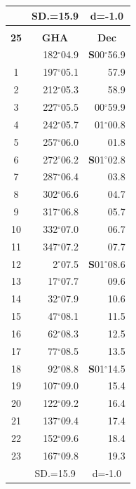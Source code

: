 \documentclass[10pt, a4paper]{report}
\begin{document}
\begin{scriptsize}
\begin{tabular*}{0.2\textwidth}[t]{@{\extracolsep{\fill}}|c|rr|}
\hline
\rule{0pt}{2.4ex} & \multicolumn{1}{c}{SD.=15.9} & \multicolumn{1}{c|}{d=-1.0}\\
\hline
\multicolumn{1}{c}{}\\[-0.5ex]\hline
\multicolumn{1}{|c|}{\rule{0pt}{2.6ex}\textbf{25}} & \multicolumn{1}{c}{\textbf{GHA}} & \multicolumn{1}{c|}{\textbf{Dec}}\\
\hline\rule{0pt}{2.6ex}\noindent
0 & 182$^\circ$04.9 & \textbf{S}00$^\circ$56.9\\
1 & 197$^\circ$05.1 & 57.9\\
2 & 212$^\circ$05.3 & 58.9\\
3 & 227$^\circ$05.5 & 00$^\circ$59.9\\
4 & 242$^\circ$05.7 & 01$^\circ$00.8\\
5 & 257$^\circ$06.0 & 01.8\\[2Pt]
6 & 272$^\circ$06.2 & \textbf{S}01$^\circ$02.8\\
7 & 287$^\circ$06.4 & 03.8\\
8 & 302$^\circ$06.6 & 04.7\\
9 & 317$^\circ$06.8 & \raisebox{0.24ex}{\boldmath$\cdot$~\boldmath$\cdot$~~}05.7\\
10 & 332$^\circ$07.0 & 06.7\\
11 & 347$^\circ$07.2 & 07.7\\[2Pt]
12 & 2$^\circ$07.5 & \textbf{S}01$^\circ$08.6\\
13 & 17$^\circ$07.7 & 09.6\\
14 & 32$^\circ$07.9 & 10.6\\
15 & 47$^\circ$08.1 & \raisebox{0.24ex}{\boldmath$\cdot$~\boldmath$\cdot$~~}11.5\\
16 & 62$^\circ$08.3 & 12.5\\
17 & 77$^\circ$08.5 & 13.5\\[2Pt]
18 & 92$^\circ$08.8 & \textbf{S}01$^\circ$14.5\\
19 & 107$^\circ$09.0 & 15.4\\
20 & 122$^\circ$09.2 & 16.4\\
21 & 137$^\circ$09.4 & \raisebox{0.24ex}{\boldmath$\cdot$~\boldmath$\cdot$~~}17.4\\
22 & 152$^\circ$09.6 & 18.4\\
23 & 167$^\circ$09.8 & 19.3\\
\hline
\rule{0pt}{2.4ex} & \multicolumn{1}{c}{SD.=15.9} & \multicolumn{1}{c|}{d=-1.0}\\
\hline
\end{tabular*}\noindent
\begin{tabular*}{0.2\textwidth}[t]{@{\extracolsep{\fill}}|c|rr|}

\end{tabular*}
\end{scriptsize}
\end{document}
